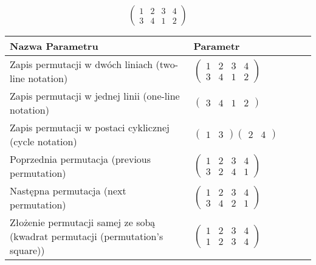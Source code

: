 \documentclass[12pt]{article}
\begin{document}
\subsection{}
\begin{center}
\[
\begin{pmatrix}
	1 & 2 & 3 & 4 \\ 
	3 & 4 & 1 & 2 
\end{pmatrix}
\]

\begin{tabular}{|m{0.6\linewidth}|m{0.4\linewidth}|}
	\hline
	Nazwa Parametru & Parametr \\
	\hline
	Zapis permutacji w dwóch liniach (two-line notation) & $\begin{pmatrix} 1 & 2 & 3 & 4 \\ 
3 & 4 & 1 & 2 \end{pmatrix}$ \\ 
	\hline
	Zapis permutacji w jednej linii (one-line notation) & $\begin{pmatrix} 3 & 4 & 1 & 2 \end{pmatrix}$ \\ 
	\hline
	Zapis permutacji w postaci cyklicznej (cycle notation) & $\begin{pmatrix} 1 & 3 \end{pmatrix} \begin{pmatrix} 2 & 4 \end{pmatrix} $ \\ 
	\hline
	Poprzednia permutacja (previous permutation) & $\begin{pmatrix} 1 & 2 & 3 & 4 \\ 
3 & 2 & 4 & 1 \end{pmatrix}$ \\ 
	\hline
	Następna permutacja (next permutation) & $\begin{pmatrix} 1 & 2 & 3 & 4 \\ 
3 & 4 & 2 & 1 \end{pmatrix}$ \\ 
	\hline
	Złożenie permutacji samej ze sobą (kwadrat permutacji (permutation's square)) & $\begin{pmatrix} 1 & 2 & 3 & 4 \\ 
1 & 2 & 3 & 4 \end{pmatrix}$ \\ 
	\hline
\end{tabular}
\end{center}
\end{document}
